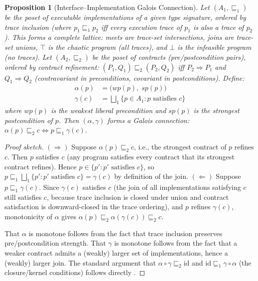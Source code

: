 \documentclass[11pt, a4paper]{googledeepmind}
\newtheorem{proposition}{Proposition}[section]
\begin{document}
\begin{proposition}[Interface--Implementation Galois Connection]
\label{prop:galois-impl}
Let $(A_1, \sqsubseteq_1)$ be the poset of executable implementations of a given type signature, ordered by trace inclusion (where $p_1 \sqsubseteq_1 p_2$ iff every execution trace of $p_1$ is also a trace of $p_2$). This forms a complete lattice: meets are trace-set intersections, joins are trace-set unions, $\top$ is the chaotic program (all traces), and $\bot$ is the infeasible program (no traces). Let $(A_2, \sqsubseteq_2)$ be the poset of contracts (pre/postcondition pairs), ordered by contract refinement: $(P_1, Q_1) \sqsubseteq_2 (P_2, Q_2)$ iff $P_2 \Rightarrow P_1$ and $Q_1 \Rightarrow Q_2$ (contravariant in preconditions, covariant in postconditions). Define:
\begin{align}
    \alpha(p) &= \bigl(\mathit{wp}(p),\; \mathit{sp}(p)\bigr) \label{eq:galois-alpha}\\
    \gamma(c) &= \bigsqcup\nolimits_1 \{p \in A_1 : p \text{ satisfies } c\} \label{eq:galois-gamma}
\end{align}
where $\mathit{wp}(p)$ is the weakest liberal precondition and $\mathit{sp}(p)$ is the strongest postcondition of $p$. Then $(\alpha, \gamma)$ forms a Galois connection: $\alpha(p) \sqsubseteq_2 c \iff p \sqsubseteq_1 \gamma(c)$.
\end{proposition}

\begin{proof}[Proof sketch]
$(\Rightarrow)$\; Suppose $\alpha(p) \sqsubseteq_2 c$, i.e., the strongest contract of $p$ refines $c$. Then $p$ satisfies $c$ (any program satisfies every contract that its strongest contract refines). Hence $p \in \{p' : p' \text{ satisfies } c\}$, so $p \sqsubseteq_1 \bigsqcup_1\{p' : p' \text{ satisfies } c\} = \gamma(c)$ by definition of the join.
$(\Leftarrow)$\; Suppose $p \sqsubseteq_1 \gamma(c)$. Since $\gamma(c)$ satisfies $c$ (the join of all implementations satisfying $c$ still satisfies $c$, because trace inclusion is closed under union and contract satisfaction is downward-closed in the trace ordering), and $p$ refines $\gamma(c)$, monotonicity of $\alpha$ gives $\alpha(p) \sqsubseteq_2 \alpha(\gamma(c)) \sqsubseteq_2 c$.

That $\alpha$ is monotone follows from the fact that trace inclusion preserves pre/postcondition strength. That $\gamma$ is monotone follows from the fact that a weaker contract admits a (weakly) larger set of implementations, hence a (weakly) larger join. The standard argument that $\alpha \circ \gamma \sqsubseteq_2 \mathrm{id}$ and $\mathrm{id} \sqsubseteq_1 \gamma \circ \alpha$ (the closure/kernel conditions) follows directly \citep{cousot1977abstract, back1980correctness}.
\end{proof}
\end{document}
